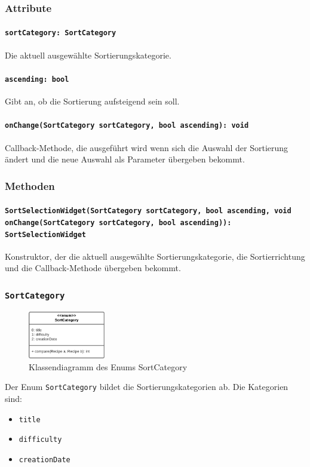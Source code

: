 \documentclass{entwurfsheft}
\begin{document}
\subsubsection*{Attribute}
\paragraph{\texttt{sortCategory: SortCategory}}
Die aktuell ausgewählte Sortierungskategorie.
\paragraph{\texttt{ascending: bool}}
Gibt an, ob die Sortierung aufsteigend sein soll.
\paragraph{\texttt{onChange(SortCategory sortCategory, bool ascending): void}} Callback-Methode, die ausgeführt wird wenn sich die Auswahl der Sortierung ändert und die neue Auswahl als Parameter übergeben bekommt.
\subsubsection*{Methoden}
\paragraph{\texttt{SortSelectionWidget(SortCategory sortCategory, bool ascending, void onChange(SortCategory sortCategory, bool ascending)): SortSelectionWidget}}
Konstruktor, der die aktuell ausgewählte Sortierungskategorie, die Sortierrichtung und die Callback-Methode übergeben bekommt.
\newpage
\subsubsection{\texttt{SortCategory}}
\begin{figure}
    [htp]
    \centering
    \includegraphics[width=0.3\textwidth]{images/presentationLayer/classDiagrams/sortCategory.pdf}
    \caption{Klassendiagramm des Enums Sort\-Category}
\end{figure}
Der Enum \texttt{SortCategory} bildet die Sortierungskategorien ab. Die Kategorien sind:
\begin{itemize}
    \item \texttt{title}
    \item \texttt{difficulty}
    \item \texttt{creationDate}
\end{itemize}
\end{document}
